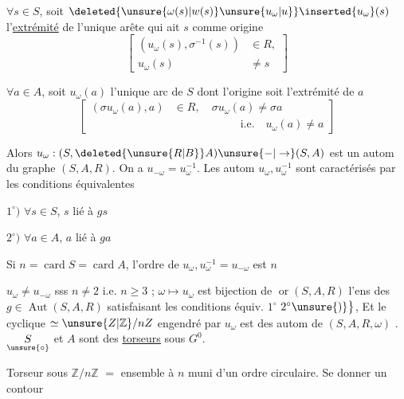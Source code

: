 $\forall s\in S$, soit $\deleted{\unsure{\omega(s)|w(s)}\unsure{u_{\omega}|u}}\inserted{u_{\omega}}(s)$ l'\uline{extrémité} de l'unique arête  qui ait  $s$ comme origine
\[
\left[\begin{aligned}(u_{\omega}(s),\sigma^{-1}(s))&\in R,\\u_{\omega}(s)&\ne s\end{aligned}\right]
\]

\reversemarginpar
{}
\normalmarginpar
$\forall a\in A$, soit $u_{\omega}(a)$ l'unique arc de $S$ dont l'origine soit l'extrémité de $a$
\[
\left[\begin{aligned}
(\sigma u_{\omega}(a),a)&\in R,\quad \sigma u_{\omega}(a)\ne\sigma a\\
&\hspace{6em}\text{i.e.}\quad u_{\omega}(a)\ne a
\end{aligned}\right]
\]

\reversemarginpar
\margin{$\big\}$}
\normalmarginpar
Alors $u_{\omega}:(S,\deleted{\unsure{R|B}}A)\unsure{-|\to}(S,A)$ est un autom du graphe $(S,A,R)$. On a $u_{-\omega}=u_{\omega}^{-1}$. Les autom $u_{\omega},u_{\omega}^{-1}$ sont caractérisés par les  conditions équivalentes

$1^{\circ})$ $\forall s\in S$, $s$ lié à $gs$

$2^{\circ})$ $\forall a\in A$, $a$ lié à $ga$

Si $n=\operatorname{card}S=\operatorname{card}A$, l'ordre de $u_{\omega},u_{\omega}^{-1}=u_{-\omega}$ est $n$

 $u_{\omega}\ne u_{-\omega}$ sss $n\ne2$ i.e. $n\geq3$ ;  $\omega\longmapsto u_{\omega}$ est bijection de $\operatorname{or}(S,A,R)$  l'ens des $g\in\operatorname{Aut}(S,A,R)$ satisfaisant les conditions équiv. $1^{\circ}$  $2^{\circ}\unsure{)}\big\}$, Et le  cyclique $\simeq\unsure{Z|\mathbb{Z}}/nZ$ engendré par $u_{\omega}$ est    des autom  de $(S,A,R,\omega)$ . $\underset{\unsure{\circ}}{S}$ et $A$ sont des \uline{torseurs} sous $G^{0}$.


Torseur sous $\mathbb{Z}/n\mathbb{Z}$  $=$ ensemble  à $n$  muni d'un ordre \unsure{$^{\times}$|$^{*}$} circulaire. Se donner un contour
